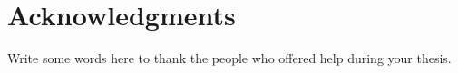 \chapter*{Acknowledgments}
\thispagestyle{empty}

Write some words here to thank the people who offered help during your thesis. 